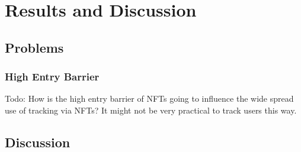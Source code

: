 \chapter{Results and Discussion}
\label{ch:results}


%
%
\section{Problems}
\label{sec:results:problems}



%
%
\subsection{High Entry Barrier}
\label{sub:results:barrier}
Todo: How is the high entry barrier of NFTs going to influence the wide spread use of tracking via NFTs? It might not be very practical to track users this way.

%
%
\section{Discussion}
\label{sec:results:discussion}
